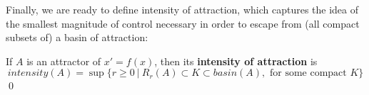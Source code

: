 Finally, we are ready to define intensity of attraction, which captures the idea of the smallest magnitude of control necessary in order to escape from (all compact subsets  of) a basin of attraction:

\begin{definition}
	If $A$ is an attractor of $x' = f(x)$, then its \textbf{intensity of attraction} is 
	$$intensity(A) = \sup\{ r \geq 0 ~|~ R_r(A) \subset K \subset basin(A), \text{ for some compact }K \}$$ \qed
\end{definition}

